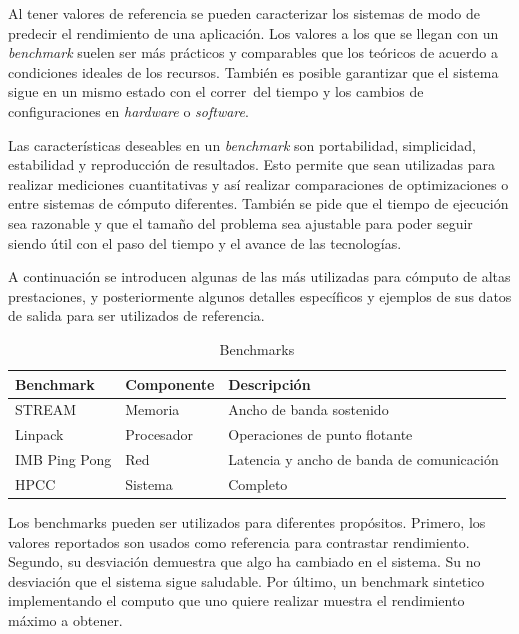\documentclass[a4paper]{report}
\begin{document}
\bigskip

Al tener valores de referencia se pueden caracterizar los sistemas de modo de predecir el rendimiento de una aplicaci\'on.
Los valores a los que se llegan con un {\it benchmark} suelen ser m\'as pr\'acticos y
comparables que los te\'oricos de acuerdo a condiciones ideales de los recursos.
Tambi\'en es posible garantizar que el sistema sigue en un mismo estado con el correr\
del tiempo y los cambios de configuraciones en {\it hardware} o {\it software}.

\bigskip

Las caracter\'isticas deseables en un {\it benchmark} son portabilidad, simplicidad, estabilidad y
reproducci\'on de resultados. Esto permite que sean utilizadas para realizar
mediciones cuantitativas y as\'i realizar comparaciones de optimizaciones o
entre sistemas de c\'omputo diferentes. Tambi\'en se pide que el tiempo de
ejecuci\'on sea razonable y que el tama\~no del problema sea ajustable para
poder seguir siendo \'util con el paso del tiempo y el avance de las
tecnolog\'ias.

\bigskip

A continuaci\'on se introducen algunas de las m\'as utilizadas para c\'omputo
de altas prestaciones, y posteriormente algunos detalles espec\'ificos y ejemplos
de sus datos de salida para ser utilizados de referencia.

\begin{table}[H]
    \caption{Benchmarks}
    \begin{center}
    \begin{tabular}{|l|l|l|}\hline
      {\bf Benchmark} & {\bf Componente} & {\bf Descripci\'on} \\ \hline
      STREAM & Memoria & Ancho de banda sostenido \\ \hline
      Linpack & Procesador & Operaciones de punto flotante \\ \hline
      IMB Ping Pong & Red & Latencia y ancho de banda de comunicaci\'on \\ \hline
      HPCC & Sistema & Completo \\ \hline
        \end{tabular}
  \label{benchmark-list}
  \end{center}
\end{table}

\bigskip

Los benchmarks pueden ser utilizados para diferentes prop\'ositos. Primero, los valores reportados son usados como referencia
para contrastar rendimiento. Segundo, su desviaci\'on demuestra que algo ha cambiado en el sistema. Su no desviaci\'on que el sistema
sigue saludable. Por \'ultimo, un benchmark sintetico implementando el computo que uno quiere realizar muestra el
rendimiento m\'aximo a obtener.
\end{document}
